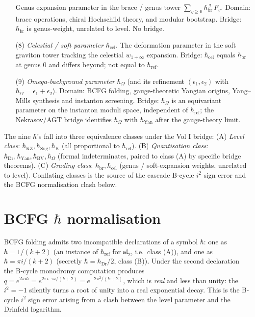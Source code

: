 \begin{enumerate}
 Genus expansion parameter in the brace / genus tower
 $\sum_{g\ge 0} \hbar_{\mathrm{br}}^{\,g}\,F_g$.
 Domain: brace operations, chiral Hochschild theory, and modular bootstrap.
 Bridge: $\hbar_{\mathrm{br}}$ is genus-weight, unrelated to level. No bridge.
\item[(8)] \emph{Celestial / soft parameter} $\hbar_{\mathrm{cel}}$.
 The deformation parameter in the soft graviton tower
 tracking the celestial
 $w_{1+\infty}$ expansion.
 Bridge: $\hbar_{\mathrm{cel}}$ equals $\hbar_{\mathrm{br}}$ at genus $0$ and
 differs beyond; not equal to $\hbar_{\mathrm{ref}}$.
\item[(9)] \emph{Omega-background parameter} $\hbar_{\Omega}$ (and its
 refinement $(\epsilon_{1},\epsilon_{2})$ with $\hbar_{\Omega}=\epsilon_{1}+\epsilon_{2}$).
 Domain: BCFG folding, gauge-theoretic Yangian origins,
 Yang--Mills synthesis and instanton screening.
 Bridge: $\hbar_{\Omega}$ is an equivariant parameter on the instanton moduli
 space, independent of $\hbar_{\mathrm{ref}}$; the Nekrasov/AGT bridge
 identifies $\hbar_{\Omega}$ with $\hbar_{\mathrm{Yan}}$ after the gauge-theory
 limit.
\end{enumerate}

\begin{remark}
The nine $\hbar$'s fall into three equivalence classes under the Vol I bridge:
(A) \emph{Level class}: $\hbar_{\mathrm{KZ}},\hbar_{\mathrm{Sug}},\hbar_{\mathrm{K}}$
(all proportional to $\hbar_{\mathrm{ref}}$). (B) \emph{Quantisation class}:
$\hbar_{\mathrm{Dr}},\hbar_{\mathrm{Yan}},\hbar_{\mathrm{BV}},\hbar_{\Omega}$
(formal indeterminates, paired to class (A) by specific bridge theorems). (C)
\emph{Grading class}: $\hbar_{\mathrm{br}},\hbar_{\mathrm{cel}}$ (genus /
soft-expansion weights, unrelated to level). Conflating classes is the source
of the cascade B-cycle $i^{2}$ sign error and the BCFG
normalisation clash below.
\end{remark}

\section{BCFG \texorpdfstring{$\hbar$}{hbar} normalisation}
\label{sec:bcfg-hbar-resolution}

BCFG folding admits two incompatible declarations of a symbol $\hbar$: one as
$\hbar = 1/(k+2)$ (an instance of $\hbar_{\mathrm{ref}}$ for $\mathfrak{sl}_{2}$,
i.e.\ class (A)), and one as $\hbar = \pi i/(k+2)$ (secretly
$\hbar = \hbar_{\mathrm{Dr}}/2$, class (B)). Under the second declaration the
B-cycle monodromy computation produces
$q = e^{2\pi i\hbar} = e^{2\pi i\cdot\pi i/(k+2)} = e^{-2\pi^{2}/(k+2)}$, which
is \emph{real} and less than unity: the $i^{2}=-1$ silently turns a root of
unity into a real exponential decay. This is the B-cycle $i^{2}$ sign error
arising from a clash between the level parameter and the Drinfeld
logarithm.

